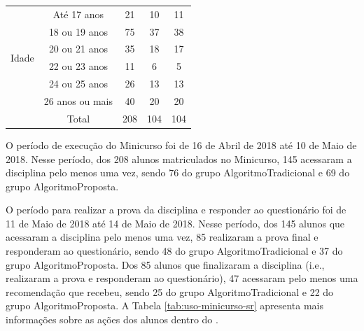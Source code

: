 \begin{table}[h]
\begin{tabular}{|c|c|c|c|c|}
  \multirow{6}{*}{Idade}                & Até 17 anos      & 21                                  & 10                   & 11                               \\
                                        & 18 ou 19 anos    & 75                                  & 37                   & 38                               \\
                                        & 20 ou 21 anos    & 35                                  & 18                   & 17                               \\
                                        & 22 ou 23 anos    & 11                                  & 6                    & 5                                \\
                                        & 24 ou 25 anos    & 26                                  & 13                   & 13                               \\
                                        & 26 anos ou mais  & 40                                  & 20                   & 20                               \\ \hline
                                        & Total            & 208                                 & 104                  & 104                              \\ \hline
\end{tabular}
\end{table}

O período de execução do Minicurso foi de 16 de Abril de 2018 até 10 de Maio de 2018. Nesse período, dos 208 alunos
matriculados no Minicurso, 145 acessaram a disciplina pelo menos uma vez, sendo 76 do grupo AlgoritmoTradicional e 69
do grupo AlgoritmoProposta.

O período para realizar a prova da disciplina e responder ao questionário foi de 11 de Maio de 2018 até
14 de Maio de 2018. Nesse período, dos 145 alunos que acessaram a disciplina pelo menos uma vez, 85 realizaram a prova final e responderam ao
questionário, sendo 48 do grupo AlgoritmoTradicional e 37 do grupo AlgoritmoProposta. Dos 85 alunos que finalizaram a
disciplina (i.e., realizaram a prova e responderam ao questionário), 47 acessaram pelo menos uma recomendação que
recebeu, sendo 25 do grupo AlgoritmoTradicional e 22 do grupo AlgoritmoProposta. A Tabela \ref{tab:uso-minicurso-sr}
apresenta mais informações sobre as ações dos alunos dentro do \adaptweb.

